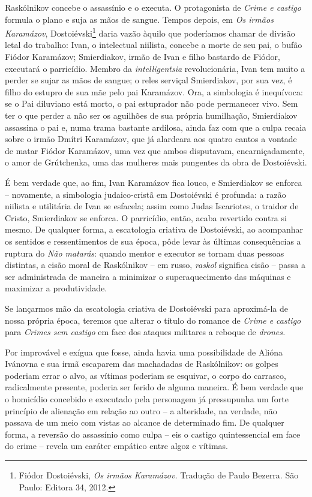 Raskólnikov concebe o assassínio e o executa. O protagonista de
\emph{Crime e castigo} formula o plano e suja as mãos de sangue. Tempos
depois, em \emph{Os irmãos Karamázov}, Dostoiévski\footnote{Fiódor
  Dostoiévski, \emph{Os irmãos Karamázov.} Tradução de Paulo Bezerra.
  São Paulo: Editora 34, 2012.} daria vazão àquilo que poderíamos chamar
de divisão letal do trabalho: Ivan, o intelectual niilista, concebe a
morte de seu pai, o bufão Fiódor Karamázov; Smierdiakov, irmão de Ivan e
filho bastardo de Fiódor, executará o parricídio. Membro da
\emph{intelligentsia} revolucionária, Ivan tem muito a perder se sujar
as mãos de sangue; o reles serviçal Smierdiakov, por sua vez, é filho do
estupro de sua mãe pelo pai Karamázov. Ora, a simbologia é inequívoca:
se o Pai diluviano está morto, o pai estuprador não pode permanecer
vivo. Sem ter o que perder a não ser os aguilhões de sua própria
humilhação, Smierdiakov assassina o pai e, numa trama bastante ardilosa,
ainda faz com que a culpa recaia sobre o irmão Dmítri Karamázov, que já
alardeara aos quatro cantos a vontade de matar Fiódor Karamázov, uma vez
que ambos disputavam, encarniçadamente, o amor de Grútchenka, uma das
mulheres mais pungentes da obra de Dostoiévski.

É bem verdade que, ao fim, Ivan Karamázov fica louco, e Smierdiakov se
enforca -- novamente, a simbologia judaico-cristã em Dostoiévski é
profunda: a razão niilista e utilitária de Ivan se esfacela; assim como
Judas Iscariotes, o traidor de Cristo, Smierdiakov se enforca. O
parricídio, então, acaba revertido contra si mesmo. De qualquer forma, a
escatologia criativa de Dostoiévski, ao acompanhar os sentidos e
ressentimentos de sua época, pôde levar às últimas consequências a
ruptura do \emph{Não matarás}: quando mentor e executor se tornam duas
pessoas distintas, a cisão moral de Raskólnikov -- em russo,
\emph{raskol} significa cisão -- passa a ser administrada de maneira a
minimizar o superaquecimento das máquinas e maximizar a produtividade.

Se lançarmos mão da escatologia criativa de Dostoiévski para aproximá-la
de nossa própria época, teremos que alterar o título do romance de
\emph{Crime e castigo} para \emph{Crimes sem castigo} em face dos
ataques militares a reboque de \emph{drones. }

Por improvável e exígua que fosse, ainda havia uma possibilidade de
Alióna Ivánovna e sua irmã escaparem das machadadas de Raskólnikov: os
golpes poderiam errar o alvo, as vítimas poderiam se esquivar, o corpo
do carrasco, radicalmente presente, poderia ser ferido de alguma
maneira. É bem verdade que o homicídio concebido e executado pela
personagem já pressupunha um forte princípio de alienação em relação ao
outro -- a alteridade, na verdade, não passava de um meio com vistas ao
alcance de determinado fim. De qualquer forma, a reversão do assassínio
como culpa -- eis o castigo quintessencial em face do crime -- revela um
caráter empático entre algoz e vítimas.

